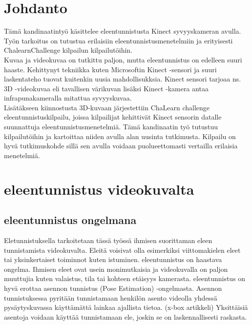 
\section{Johdanto}

Tämä kandinaatintyö käsittelee eleentunnistusta Kinect syvyyskameran avulla. 
Työn tarkoitus on tutustua erilaisiin eleentunnistusmenetelmiin ja erityisesti ChalearnChallenge kilpailun kilpailutöihin. 
\\

Kuvaa ja videokuvaa on tutkittu paljon, mutta eleentunnistus on edelleen suuri haaste. Kehittynyt tekniikka
kuten Microsoftin Kinect -sensori ja suuri laskentateho tuovat kuitenkin uusia mahdollisukksia. 
Kinect sensori tarjoaa ns. 3D -videokuvaa eli tavallisen värikuvan lisäksi Kinect -kamera antaa infrapunakameralla mitattua syvyyskuvaa.\\

Lisätäkseen kiinnostusta 3D-kuvaan järjestettiin ChaLearn challenge eleentunnistuskilpailu, joissa kilpailijat kehittivät Kinect sensorin datalle suunnattuja 
eleentunnistusmenetelmiä. Tämä kandinaatin työ tutustuu kilpailutöihin ja kartoittaa niiden avulla alan uusinta tutkimusta. Kilpailu on hyvä tutkimuskohde
sillä sen avulla voidaan puolueettomasti vertailla erilaisia menetelmiä. \\



\section{eleentunnistus videokuvalta}
\label{eleentunnistus videokuvalta}


\subsection{eleentunnistus ongelmana}
Eletunnistuksella tarkoitetaan tässä työssä ihmisen suorittaman eleen tunnistamista videokuvalta. Eleitä voisivat olla esimerkiksi
viittomakielen eleet tai yksinkertaiset toiminnot kuten istuminen. eleentunnistus on haastava ongelma. Ihmisen eleet ovat usein 
monimutkaisia ja videokuvalla on paljon muuttujia kuten valaistus, tila tai kohteen etäisyys kamerasta.\citep {1251144} eleentunnistus on hyvä erottaa
asennon tunnistus (Pose Estimation) -ongelmasta. Asennon tunnistuksessa pyritään tunnistamaan henkilön asento videolla yhdessä pysäytyskuvassa
käyttämättä lainkaa ajallista tietoa. (x-box artikkeli) Yksittäisiä asentoja voidaan käyttää tunnistamaan ele, joskin se on laskennallisesti raskasta.\\

